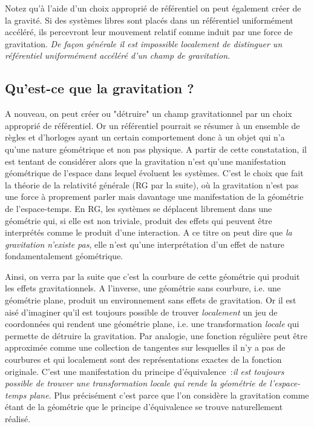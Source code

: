 Notez qu'à l'aide d'un choix approprié de référentiel on peut également créer de la gravité. Si des systèmes libres sont placés dans un référentiel uniformément accéléré, ils percevront leur mouvement relatif comme induit par une force de gravitation. \textit{De façon générale il est impossible localement de distinguer un référentiel uniformément accéléré d'un champ de gravitation.}

\subsection{Qu'est-ce que la gravitation ?}
A nouveau, on peut créer ou "détruire" un champ gravitationnel par un choix approprié de référentiel. Or un référentiel pourrait se résumer à un ensemble de règles et d'horloges ayant un certain comportement donc à un objet qui n'a qu'une nature géométrique et non pas physique. A partir de cette constatation, il est tentant de considérer alors que la gravitation n'est qu'une manifestation géométrique de l'espace dans lequel évoluent les systèmes. C'est le choix que fait la théorie de la relativité générale (RG par la suite), où la gravitation n'est pas une force à proprement parler mais davantage une manifestation de la géométrie de l'espace-temps. En RG, les systèmes se déplacent librement dans une géométrie qui, si elle est non triviale, produit des effets qui peuvent être interprétés comme le produit d'une interaction. A ce titre on peut dire que \textit{la gravitation n'existe pas}, elle n'est qu'une interprétation d'un effet de nature fondamentalement géométrique. 

Ainsi, on verra par la suite que c'est la courbure de cette géométrie qui produit les effets gravitationnels. A l'inverse, une géométrie sans courbure, i.e. une géométrie plane, produit un environnement sans effets de gravitation. Or il est aisé d'imaginer qu'il est toujours possible de trouver \textit{localement} un jeu de coordonnées qui rendent une géométrie plane, i.e. une transformation \textit{locale} qui permette de détruire la gravitation. Par analogie, une fonction régulière peut être approximée comme une collection de tangentes sur lesquelles il n'y a pas de courbures et qui localement sont des représentations exactes de la fonction originale. C'est une manifestation du principe d'équivalence~:\textit{il est toujours possible de trouver une transformation locale qui rende la géométrie de l'espace-temps plane}. Plus précisément c'est parce que l'on considère la gravitation comme étant de la géométrie que le principe d'équivalence se trouve naturellement réalisé.

